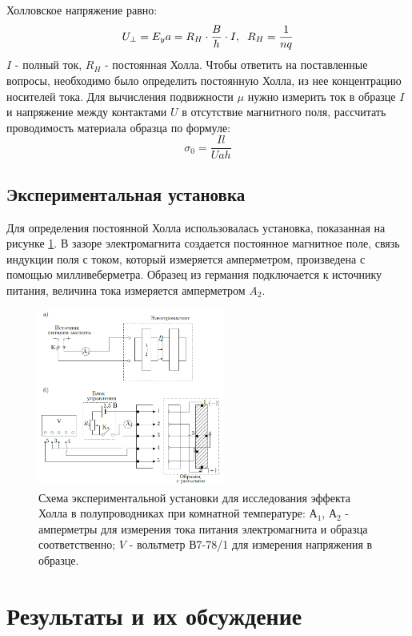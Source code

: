 \documentclass[a4paper,12pt]{article} %
\begin{document}
Холловское напряжение равно:
\begin{equation}
\label{R_H}
U_\perp = E_y a=R_H\cdot \frac{B}{h}\cdot I, \hspace{2mm} R_H=\frac{1}{nq}
\end{equation}
$I$ - полный ток, $R_H$ - постоянная Холла.
Чтобы ответить на поставленные вопросы, необходимо было определить постоянную Холла, из нее концентрацию носителей тока. Для вычисления подвижности $\mu$ нужно измерить ток в образце $I$ и напряжение между контактами $U$ в отсутствие магнитного поля, рассчитать проводимость материала образца по формуле:
\begin{equation}
\label{sigma}
\sigma_0 = \frac{Il}{Uah}
\end{equation} 
\subsection*{Экспериментальная установка}
Для определения постоянной Холла использовалась установка, показанная на рисунке \ref{установка}. В зазоре электромагнита создается постоянное магнитное поле, связь индукции поля с током, который измеряется амперметром, произведена с помощью милливеберметра. Образец из германия подключается к источнику питания, величина тока измеряется амперметром $A_2$.
\begin{figure}[h!]
\begin{center}
\includegraphics[width=0.55\textwidth]{Установка}
\caption{Схема экспериментальной установки для исследования эффекта Холла в полупроводниках при комнатной температуре: А$_1$, А$_2$ - амперметры для измерения тока питания электромагнита и образца соответственно; $V$ - вольтметр В7-78/1 для измерения напряжения в образце.} \label{установка}
\end{center}
\end{figure} 
\section{Результаты и их обсуждение}
\end{document}

